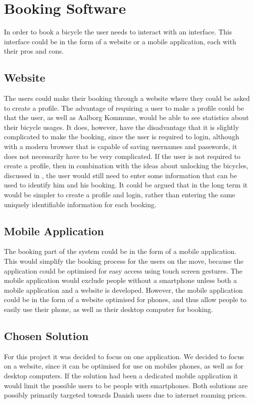 \section{Booking Software}
In order to book a bicycle the user needs to interact with an interface.
This interface could be in the form of a website or a mobile application, each with their pros and cons.

\subsection{Website}
The users could make their booking through a website where they could be asked to create a profile.
The advantage of requiring a user to make a profile could be that the user, as well as Aalborg Kommune, would be able to see statistics about their bicycle usages.
It does, however, have the disadvantage that it is slightly complicated to make the booking, since the user is required to login, although with a modern browser that is capable of saving usernames and passwords, it does not necessarily have to be very complicated.
If the user is not required to create a profile, then in combination with the ideas about unlocking the bicycles, discussed in , the user would still need to enter some information that can be used to identify him and his booking.
It could be argued that in the long term it would be simpler to create a profile and login, rather than entering the same uniquely identifiable information for each booking.

\subsection{Mobile Application}
The booking part of the system could be in the form of a mobile application. 
This would simplify the booking process for the users on the move, because the application could be optimised for easy access using touch screen gestures.
The mobile application would exclude people without a smartphone unless both a mobile application and a website is developed.
However, the mobile application could be in the form of a website optimised for phones, and thus allow people to easily use their phone, as well as their desktop computer for booking. 

\subsection{Chosen Solution}
For this project it was decided to focus on one application.
We decided to focus on a website, since it can be optimised for use on mobiles phones, as well as for desktop computers. 
If the solution had been a dedicated mobile application it would limit the possible users to be people with smartphones.
Both solutions are possibly primarily targeted towards Danish users due to internet roaming prices.

